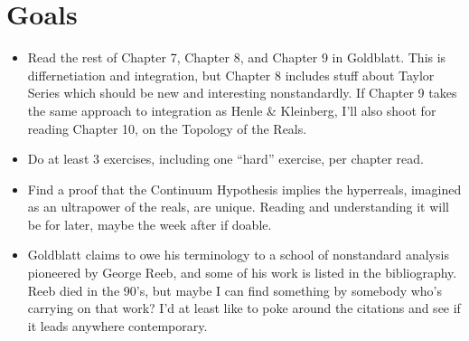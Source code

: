 \documentclass{article}
\begin{document}
\section*{Goals}
\begin{itemize}
    \item Read the rest of Chapter 7, Chapter 8, and Chapter 9 in Goldblatt. This is differnetiation and integration, but Chapter 8 includes stuff about Taylor Series which should be new and interesting nonstandardly. If Chapter 9 takes the same approach to integration as Henle \& Kleinberg, I'll also shoot for reading Chapter 10, on the Topology of the Reals.
    \item Do at least 3 exercises, including one ``hard'' exercise, per chapter read.
    \item Find a proof that the Continuum Hypothesis implies the hyperreals, imagined as an ultrapower of the reals, are unique. Reading and understanding it will be for later, maybe the week after if doable.
    \item Goldblatt claims to owe his terminology to a school of nonstandard analysis pioneered by George Reeb, and some of his work is listed in the bibliography. Reeb died in the 90's, but maybe I can find something by somebody who's carrying on that work? I'd at least like to poke around the citations and see if it leads anywhere contemporary.
\end{itemize}

\nocite{henle1979}
\printbibliography[title={Books}]
\end{document}
